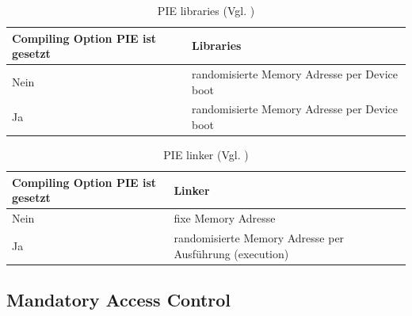 \begin{table}
    \begin{center}
      \begin{tabular}{|p{6cm}|p{9cm}|} \hline
            Compiling Option PIE ist gesetzt & Libraries \\ \hline
            Nein & randomisierte Memory Adresse per Device boot\\ \hline
            Ja & randomisierte Memory Adresse per Device boot \\ \hline
        \end{tabular}
        \caption{PIE libraries (Vgl. \cite{iOSSec[5]})}
       \label{tab:PIE libraries}
    \end{center}
\end{table}

 \begin{table}
    \begin{center}
        \begin{tabular}{|p{6cm}|p{9cm}|} \hline
            Compiling Option PIE ist gesetzt & Linker  \\ \hline
            Nein & fixe Memory Adresse\\ \hline
            Ja & randomisierte Memory Adresse per Ausführung (execution)\\ \hline
        \end{tabular}
        \caption{PIE linker (Vgl. \cite{iOSSec[5]})}
       \label{tab:PIE linker }
    \end{center}
\end{table}

\subsection{Mandatory Access Control}
\label{sec:MAC}

